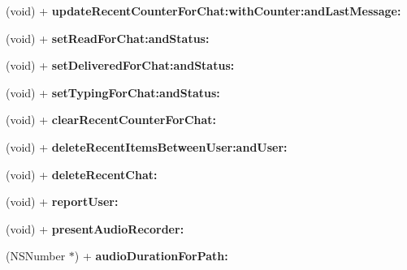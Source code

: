 \begin{DoxyCompactItemize}
\item 
\hypertarget{interface_e_s_utility_a0b4ad18365294ebc636db05adca11d05}{}(void) + {\bfseries update\+Recent\+Counter\+For\+Chat\+:with\+Counter\+:and\+Last\+Message\+:}\label{interface_e_s_utility_a0b4ad18365294ebc636db05adca11d05}

\item 
\hypertarget{interface_e_s_utility_a0b8254fabf2e1ada1f7e0066cc2de1bb}{}(void) + {\bfseries set\+Read\+For\+Chat\+:and\+Status\+:}\label{interface_e_s_utility_a0b8254fabf2e1ada1f7e0066cc2de1bb}

\item 
\hypertarget{interface_e_s_utility_a1ff5ea9158ed6669255d4b889360a200}{}(void) + {\bfseries set\+Delivered\+For\+Chat\+:and\+Status\+:}\label{interface_e_s_utility_a1ff5ea9158ed6669255d4b889360a200}

\item 
\hypertarget{interface_e_s_utility_ac9a50b6f02d29931973e4be861f2e5cc}{}(void) + {\bfseries set\+Typing\+For\+Chat\+:and\+Status\+:}\label{interface_e_s_utility_ac9a50b6f02d29931973e4be861f2e5cc}

\item 
\hypertarget{interface_e_s_utility_a7ad1e2f35e3567cc91552b6adad7922d}{}(void) + {\bfseries clear\+Recent\+Counter\+For\+Chat\+:}\label{interface_e_s_utility_a7ad1e2f35e3567cc91552b6adad7922d}

\item 
\hypertarget{interface_e_s_utility_a86c3bbe1ac20ad8d5467f53536cddb8c}{}(void) + {\bfseries delete\+Recent\+Items\+Between\+User\+:and\+User\+:}\label{interface_e_s_utility_a86c3bbe1ac20ad8d5467f53536cddb8c}

\item 
\hypertarget{interface_e_s_utility_a2a0c3a79ad5c412f7f8caf9bd06137d2}{}(void) + {\bfseries delete\+Recent\+Chat\+:}\label{interface_e_s_utility_a2a0c3a79ad5c412f7f8caf9bd06137d2}

\item 
\hypertarget{interface_e_s_utility_a294cfefdcc893ae12a6280958a876289}{}(void) + {\bfseries report\+User\+:}\label{interface_e_s_utility_a294cfefdcc893ae12a6280958a876289}

\item 
\hypertarget{interface_e_s_utility_aa4c863eddcdf2d9e5fc2292c5bca53b9}{}(void) + {\bfseries present\+Audio\+Recorder\+:}\label{interface_e_s_utility_aa4c863eddcdf2d9e5fc2292c5bca53b9}

\item 
\hypertarget{interface_e_s_utility_a45a8512e062a513ecdacdb413f96bb06}{}(N\+S\+Number $\ast$) + {\bfseries audio\+Duration\+For\+Path\+:}\label{interface_e_s_utility_a45a8512e062a513ecdacdb413f96bb06}


\end{DoxyCompactItemize}
